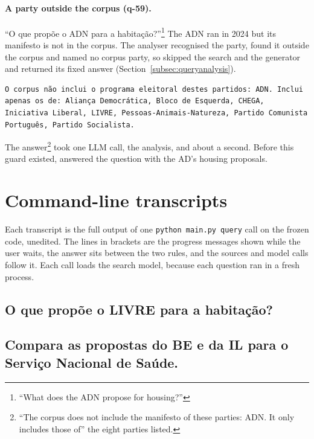 \paragraph{A party outside the corpus (q-59).} ``O que propõe o ADN para a
habitação?''\footnote{``What does the ADN propose for housing?''} The ADN
ran in 2024 but its manifesto is not in the corpus. The analyser recognised
the party, found it outside the corpus and named no corpus party, so
\sysname{} skipped the search and the generator and returned its fixed
answer (Section~\ref{subsec:queryanalysis}).

\begin{Verbatim}[fontsize=\scriptsize, breaklines=true, frame=single]
O corpus não inclui o programa eleitoral destes partidos: ADN. Inclui apenas os de: Aliança Democrática, Bloco de Esquerda, CHEGA, Iniciativa Liberal, LIVRE, Pessoas-Animais-Natureza, Partido Comunista Português, Partido Socialista.
\end{Verbatim}

The answer\footnote{``The corpus does not include the manifesto of these
parties: ADN. It only includes those of'' the eight parties listed.} took one
LLM call, the analysis, and about a second. Before this guard existed,
\sysname{} answered the question with the AD's housing proposals.

\section{Command-line transcripts} \label{sec:app-transcripts}

Each transcript is the full output of one \texttt{python main.py query} call
on the frozen code, unedited. The lines in brackets are the progress messages
shown while the user waits, the answer sits between the two rules, and the
sources and model calls follow it. Each call loads the search model, because
each question ran in a fresh process.

\subsection*{O que propõe o LIVRE para a habitação?}

\subsection*{Compara as propostas do BE e da IL para o Serviço Nacional de Saúde.}

